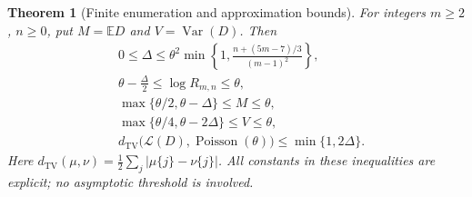 \documentclass[11pt,letterpaper]{article}
\numberwithin{equation}{subsection}
\newtheorem{theorem}{Theorem}[subsection]
\theoremstyle{definition}
\theoremstyle{remark}
\theoremstyle{plain}
\newcommand{\E}{\mathbb E}
\newcommand{\Var}{\operatorname{Var}}
\newcommand{\Poi}{\operatorname{Poisson}}
\newcommand{\TV}{d_{\mathrm{TV}}}
\begin{document}
\begin{theorem}[Finite enumeration and approximation bounds]\label{a122:pd:thm:finite}
For integers $m\ge2$, $n\ge0$, put $M=\E D$ and $V=\Var(D)$. Then
\begin{align}
 &0\le\Delta\le
 \theta^2\min\left\{1,
 \frac{n+(5m-7)/3}{(m-1)^2}\right\},\label{a122:pd:eq:Deltabound}\\
 &\theta-\frac\Delta2\le\log R_{m,n}\le\theta,\label{a122:pd:eq:logRbound}\\
 &\max\{\theta/2,\theta-\Delta\}\le M\le\theta,\label{a122:pd:eq:meanbound}\\
 &\max\{\theta/4,\theta-2\Delta\}\le V\le\theta,\label{a122:pd:eq:varbound}\\
 &\TV\bigl(\mathcal L(D),\Poi(\theta)\bigr)
 \le\min\{1,2\Delta\}.\label{a122:pd:eq:TVbound}
\end{align}
Here $\TV(\mu,\nu)=\tfrac12\sum_j|\mu\{j\}-\nu\{j\}|$.
All constants in these inequalities are explicit; no asymptotic
threshold is involved.
\end{theorem}
\end{document}
